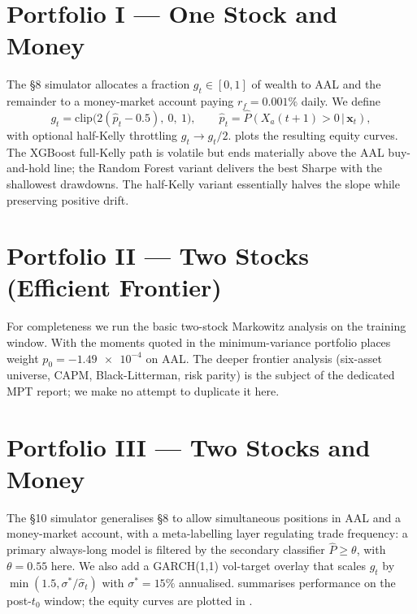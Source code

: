 \documentclass[runningheads]{llncs}
\begin{document}
\section{Portfolio I --- One Stock and Money}\label{sec:s8}
The §8 simulator allocates a fraction $g_t\in[0,1]$ of wealth to AAL
and the remainder to a money-market account paying
$r_f{=}\num{0.001}\%$ daily. We define
\[
g_t = \mathrm{clip}\bigl(2(\hat p_t - 0.5),\ 0,\ 1\bigr),\qquad
\hat p_t = \widehat{P}(X_a(t{+}1){>}0\,|\,\mathbf{x}_t),
\]
with optional half-Kelly throttling $g_t \to g_t/2$. 
plots the resulting equity curves. The XGBoost full-Kelly path is
volatile but ends materially above the AAL buy-and-hold line; the Random
Forest variant delivers the best Sharpe with the shallowest drawdowns.
The half-Kelly variant essentially halves the slope while preserving
positive drift.

\section{Portfolio II --- Two Stocks (Efficient Frontier)}\label{sec:s9}
For completeness we run the basic two-stock Markowitz analysis on the
training window. With the moments quoted in  the
minimum-variance portfolio places weight $p_{0}{=}-\num{1.49e-4}$ on AAL.
The deeper frontier analysis (six-asset universe, CAPM, Black-Litterman,
risk parity) is the subject of the dedicated MPT report; we make no
attempt to duplicate it here.

\section{Portfolio III --- Two Stocks and Money}\label{sec:s10}
The §10 simulator generalises §8 to allow simultaneous positions in
AAL and a money-market account, with a meta-labelling layer
\cite{lopez2018} regulating trade frequency: a primary always-long
model is filtered by the secondary classifier
$\widehat{P}\geq\theta$, with $\theta{=}0.55$ here. We also add a
GARCH(1,1) vol-target overlay that scales $g_t$ by
$\min(1.5,\sigma^{*}/\hat\sigma_{t})$ with
$\sigma^{*}{=}15\%$ annualised.
 summarises performance on the post-$t_{0}$
window; the equity curves are plotted in .
\end{document}
